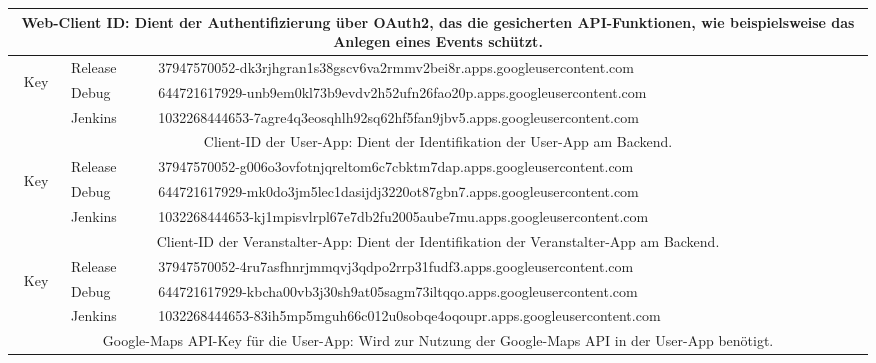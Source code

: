 \begin{table}[htb]
	\begin{tabular}{|c|l|l|}
		\hline
		\multicolumn{3}{|p{15cm}|}{
			Web-Client ID: Dient der Authentifizierung über OAuth2, das die gesicherten API-Funktionen, wie beispielsweise das Anlegen eines Events schützt.
		} \\
		\hline
		\multirow{3}{3mm}{\begin{sideways}Key\end{sideways}} & Release & 37947570052-dk3rjhgran1s38gscv6va2rmmv2bei8r.apps.googleusercontent.com \\
		\cline{2-3}
		& Debug & 644721617929-unb9em0kl73b9evdv2h52ufn26fao20p.apps.googleusercontent.com \\
		\cline{2-3}
		& Jenkins & 1032268444653-7agre4q3eosqhlh92sq62hf5fan9jbv5.apps.googleusercontent.com \\
		\hline
		\hline
		\multicolumn{3}{|p{15cm}|}{
			Client-ID der User-App: Dient der Identifikation der User-App am Backend.
		} \\
		\hline
		\multirow{3}{3mm}{\begin{sideways}Key\end{sideways}} & Release & 37947570052-g006o3ovfotnjqreltom6c7cbktm7dap.apps.googleusercontent.com \\
		\cline{2-3}
		& Debug & 644721617929-mk0do3jm5lec1dasijdj3220ot87gbn7.apps.googleusercontent.com \\
		\cline{2-3}
		& Jenkins & 1032268444653-kj1mpisvlrpl67e7db2fu2005aube7mu.apps.googleusercontent.com \\
		\hline
		\hline
		\multicolumn{3}{|p{15cm}|}{
			Client-ID der Veranstalter-App: Dient der Identifikation der Veranstalter-App am Backend.
		} \\
		\hline
		\multirow{3}{3mm}{\begin{sideways}Key\end{sideways}} & Release & 37947570052-4ru7asfhnrjmmqvj3qdpo2rrp31fudf3.apps.googleusercontent.com \\
		\cline{2-3}
		& Debug & 644721617929-kbcha00vb3j30sh9at05sagm73iltqqo.apps.googleusercontent.com \\
		\cline{2-3}
		& Jenkins & 1032268444653-83ih5mp5mguh66c012u0sobqe4oqoupr.apps.googleusercontent.com \\
		\hline
		\hline
		\multicolumn{3}{|p{15cm}|}{
			Google-Maps API-Key für die User-App: Wird zur Nutzung der Google-Maps API in der User-App benötigt.
		} \\
		\hline

\end{tabular}
\end{table}
